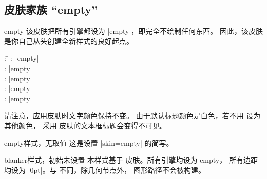 \clearpage
\subsection{皮肤家族 \enquote{empty}}

\begin{docSkin}{empty}
  该皮肤把所有引擎都设为 |empty|，即完全不绘制任何东西。
  因此，该皮肤是你自己从头创建全新样式的良好起点。
\begin{tcolorbox}[skintable=empty]
  \begin{tabbing}
    : \=\kill
    :           \> |empty|\\
    : \> |empty|\\ 
    :        \> |empty|\\
    :    \> |empty|\\
    :           \> |empty|
  \end{tabbing}
\end{tcolorbox}
\end{docSkin}


\begin{marker}
  请注意，应用皮肤时文字颜色保持不变。
  由于默认标题颜色是白色，若不用  设为其他颜色，
  采用  皮肤的文本框标题会变得不可见。
\end{marker}


\begin{docTcbKey}{empty}{}{样式，无取值}
  这是设置 |skin=empty| 的简写。
\end{docTcbKey}


\begin{dispExample}
\end{dispExample}


\clearpage
\begin{docTcbKey}{blanker}{}{样式，初始未设置}
  本样式基于  皮肤。所有引擎均设为 empty，
  所有边距均设为 |0pt|。与  不同，除几何节点外，
  图形路径不会被构建。
\begin{dispExample}
\begin{tcolorbox}[blanker,watermark text=A blank box]
\lipsum[1]
\end{tcolorbox}
\end{dispExample}

\end{docTcbKey}



